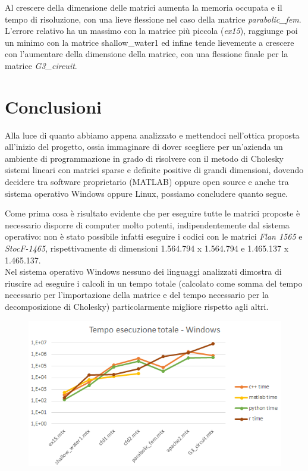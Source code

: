 \documentclass[a4paper,12pt]{article}
\begin{document}
Al crescere della dimensione delle matrici aumenta la memoria occupata e il tempo di risoluzione, con una lieve flessione nel caso della matrice \textit{parabolic\_fem}.
L’errore relativo ha un massimo con la matrice più piccola (\textit{ex15}), raggiunge poi un minimo con la matrice shallow\_water1 ed infine tende lievemente a crescere con l’aumentare della dimensione della matrice, con una flessione finale per la matrice \textit{G3\_circuit}.

\newpage

\fancyhf{}
\fancyfoot[C]{\thepage}

\section{Conclusioni}
Alla luce di quanto abbiamo appena analizzato e mettendoci nell’ottica proposta all’inizio del progetto, ossia immaginare di dover scegliere per un’azienda un ambiente di programmazione in grado di risolvere con il metodo di Cholesky sistemi lineari con matrici sparse e deﬁnite positive di grandi dimensioni, dovendo decidere tra software proprietario (MATLAB) oppure open source e anche tra sistema operativo Windows oppure Linux, possiamo concludere quanto segue.
\bigskip

\noindent Come prima cosa è risultato evidente che per eseguire tutte le matrici proposte è necessario disporre di computer molto potenti, indipendentemente dal sistema operativo: non è stato possibile infatti eseguire i codici con le matrici \textit{Flan 1565} e \textit{StocF-1465}, rispettivamente di dimensioni 1.564.794 x 1.564.794 e 1.465.137 x 1.465.137.\\

\noindent Nel sistema operativo Windows nessuno dei linguaggi analizzati dimostra di riuscire ad eseguire i calcoli in un tempo totale (calcolato come somma del tempo necessario per l'importazione della matrice e del tempo necessario per la decomposizione di Cholesky) particolarmente migliore rispetto agli altri.

\begin{figure}[H]
\centering
  \includegraphics[width=0.7\linewidth]{img/tempototwin.png}
\end{figure}
\end{document}
